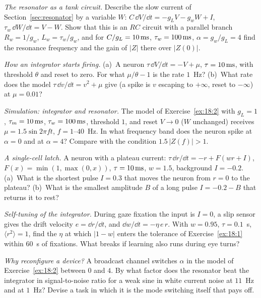 \begin{exercise}[\lvlB]
\label{ex:18:2}
\emph{The resonator as a tank circuit.} Describe the slow current of Section~\ref{sec:resonator} by a variable $W$: $C\,\dd V/\dd t=-g_LV-g_wW+I$, $\tau_w\,\dd W/\dd t=V-W$. Show that this is an $RC$ circuit with a parallel branch $R_w=1/g_w$, $L_w=\tau_w/g_w$, and for $C/g_L=10\,\text{ms}$, $\tau_w=100\,\text{ms}$, $\alpha=g_w/g_L=4$ find the resonance frequency and the gain of $|Z|$ there over $|Z(0)|$.
\end{exercise}

\begin{exercise}[\lvlB]
\label{ex:18:3}
\emph{How an integrator starts firing.} (a)~A neuron $\tau\,\dd V/\dd t=-V+\mu$, $\tau=10\,\text{ms}$, with threshold $\theta$ and reset to zero. For what $\mu/\theta-1$ is the rate $1$~Hz? (b)~What rate does the model $\tau\,\dd v/\dd t=v^2+\mu$ give (a spike is $v$ escaping to $+\infty$, reset to $-\infty$) at $\mu=0.01$?
\end{exercise}

\begin{exercise}[\lvlB]
\label{ex:18:4}
\emph{Simulation: integrator and resonator.} The model of Exercise~\ref{ex:18:2} with $g_L=1$, $\tau_m=10\,\text{ms}$, $\tau_w=100\,\text{ms}$, threshold $1$, and reset $V\to0$ ($W$ unchanged) receives $\mu=1.5\sin2\pi ft$, $f=1$--$40$~Hz. In what frequency band does the neuron spike at $\alpha=0$ and at $\alpha=4$? Compare with the condition $1.5\,|Z(f)|>1$.
\end{exercise}

\begin{exercise}[\lvlB]
\label{ex:18:5}
\emph{A single-cell latch.} A neuron with a plateau current: $\tau\,\dd r/\dd t=-r+F(wr+I)$, $F(x)=\min(1,\max(0,x))$, $\tau=10\,\text{ms}$, $w=1.5$, background $I=-0.2$. (a)~What is the shortest pulse $I=0.3$ that moves the neuron from $r=0$ to the plateau? (b)~What is the smallest amplitude $B$ of a long pulse $I=-0.2-B$ that returns it to rest?
\end{exercise}

\begin{exercise}[\lvlB]
\label{ex:18:6}
\emph{Self-tuning of the integrator.} During gaze fixation the input is $I=0$, a slip sensor gives the drift velocity $e=\dd r/\dd t$, and $\dd w/\dd t=-\eta\,e\,r$. With $w=0.95$, $\tau=0.1$~s, $\langle r^2\rangle=1$, find the $\eta$ at which $|1-w|$ enters the tolerance of Exercise~\ref{ex:18:1} within $60$~s of fixations. What breaks if learning also runs during eye turns?
\end{exercise}

\begin{exercise}[\lvlC]
\label{ex:18:7}
\emph{Why reconfigure a device?} A broadcast channel switches $\alpha$ in the model of Exercise~\ref{ex:18:2} between $0$ and $4$. By what factor does the resonator beat the integrator in signal-to-noise ratio for a weak sine in white current noise at $11$~Hz and at $1$~Hz? Devise a task in which it is the mode switching itself that pays off.
\end{exercise}
